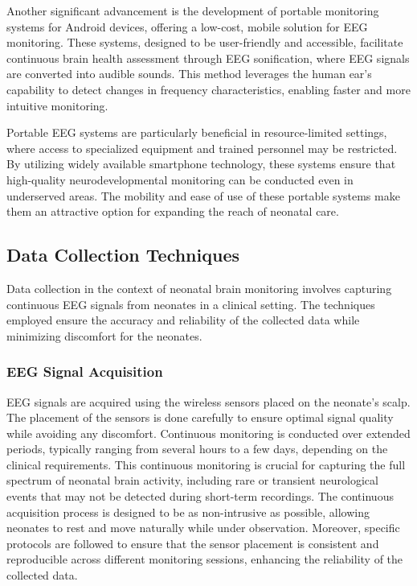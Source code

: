 \documentclass[12pt,journal,compsoc]{IEEEtran}
\begin{document}
Another significant advancement is the development of portable monitoring systems for Android devices, offering a low-cost, mobile solution for EEG monitoring. These systems, designed to be user-friendly and accessible, facilitate continuous brain health assessment through EEG sonification, where EEG signals are converted into audible sounds. This method leverages the human ear's capability to detect changes in frequency characteristics, enabling faster and more intuitive monitoring.

Portable EEG systems are particularly beneficial in resource-limited settings, where access to specialized equipment and trained personnel may be restricted. By utilizing widely available smartphone technology, these systems ensure that high-quality neurodevelopmental monitoring can be conducted even in underserved areas. The mobility and ease of use of these portable systems make them an attractive option for expanding the reach of neonatal care.

\subsection{Data Collection Techniques}

Data collection in the context of neonatal brain monitoring involves capturing continuous EEG signals from neonates in a clinical setting. The techniques employed ensure the accuracy and reliability of the collected data while minimizing discomfort for the neonates.

\subsubsection{EEG Signal Acquisition}

EEG signals are acquired using the wireless sensors placed on the neonate’s scalp. The placement of the sensors is done carefully to ensure optimal signal quality while avoiding any discomfort. Continuous monitoring is conducted over extended periods, typically ranging from several hours to a few days, depending on the clinical requirements. This continuous monitoring is crucial for capturing the full spectrum of neonatal brain activity, including rare or transient neurological events that may not be detected during short-term recordings. The continuous acquisition process is designed to be as non-intrusive as possible, allowing neonates to rest and move naturally while under observation. Moreover, specific protocols are followed to ensure that the sensor placement is consistent and reproducible across different monitoring sessions, enhancing the reliability of the collected data.
\end{document}
